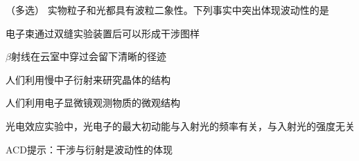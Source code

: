（多选）
实物粒子和光都具有波粒二象性。下列事实中突出体现波动性的是\paren[]
\begin{choices}
	\item 电子束通过双缝实验装置后可以形成干涉图样
	\item \(\beta\)射线在云室中穿过会留下清晰的径迹
	\item 人们利用慢中子衍射来研究晶体的结构
	\item 人们利用电子显微镜观测物质的微观结构
	\item 光电效应实验中，光电子的最大初动能与入射光的频率有关，与入射光的强度无关
\end{choices}
\begin{answer}
	ACD\qquad 提示：干涉与衍射是波动性的体现
\end{answer}